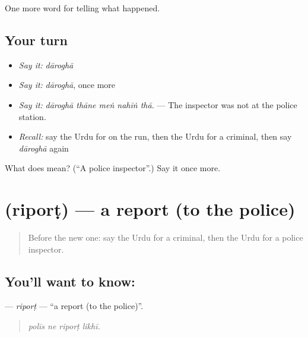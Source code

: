 \begin{grammarlens}[title={What you've built}]
One more word for telling what happened.
\end{grammarlens}

\subsection*{Your turn}
\begin{itemize}
\raggedright
  \item \emph{Say it:} \emph{dāroghā}
  \item \emph{Say it:} \emph{dāroghā}, once more
  \item \emph{Say it:} \emph{dāroghā thāne meṅ nahīṅ thā.} — The inspector was not at the police station.
  \item \emph{Recall:} say the Urdu for on the run, then the Urdu for a criminal, then say \emph{dāroghā} again
\end{itemize}

\begin{tcolorbox}[breakable,colback=teal!4,colframe=teal!35!black,title={Before you move on}]
What does  mean? (\textquotedblleft{}A police inspector\textquotedblright{}.) Say it once more.
\end{tcolorbox}
\section[\texorpdfstring{\ur{رپورٹ} (riporṭ)}{رپورٹ (riporṭ)}]{ (riporṭ) — a report (to the police)}

\label{lesson:UR-C278-riport}



\begin{quote}
Before the new one: say the Urdu for a criminal, then the Urdu for a police inspector.
\end{quote}

\subsection*{You'll want to know: }
\textbf{} — \emph{riporṭ} — \textquotedblleft{}a report (to the police)\textquotedblright{}.

\begin{quote}
   
\end{quote}

\begin{quote}
\emph{polīs ne riporṭ likhī.}
\end{quote}


